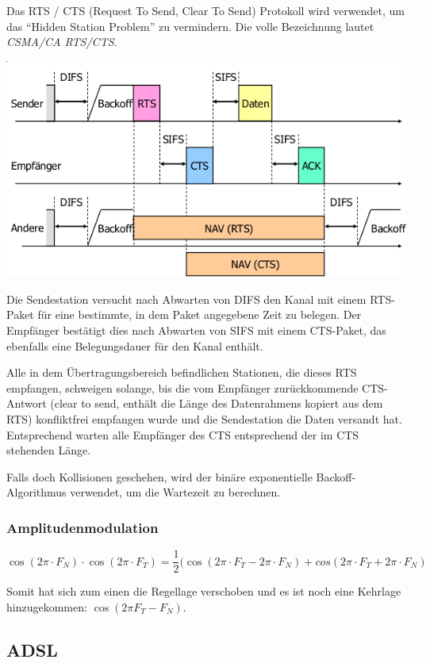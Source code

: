 Das RTS / CTS (Request To Send, Clear To Send) Protokoll wird verwendet, um das
``Hidden Station Problem'' zu vermindern. Die volle Bezeichnung lautet
\textit{CSMA/CA RTS/CTS}.

\begin{center}
	\includegraphics[width=.8\textwidth]{media/rts_cts.png}
\end{center}

Die Sendestation versucht nach Abwarten von DIFS den Kanal mit einem RTS-Paket
für eine bestimmte, in dem Paket angegebene Zeit zu belegen. Der Empfänger
bestätigt dies nach Abwarten von SIFS mit einem CTS-Paket, das ebenfalls eine
Belegungsdauer für den Kanal enthält.

Alle in dem Übertragungsbereich befindlichen Stationen, die dieses RTS
empfangen, schweigen solange, bis die vom Empfänger zurückkommende CTS-Antwort
(clear to send, enthält die Länge des Datenrahmens kopiert aus dem RTS)
konfliktfrei empfangen wurde und die Sendestation die Daten versandt hat.
Entsprechend warten alle Empfänger des CTS entsprechend der im CTS stehenden
Länge.

Falls doch Kollisionen geschehen, wird der binäre exponentielle
Backoff-Algorithmus verwendet, um die Wartezeit zu berechnen.

\subsubsection{Amplitudenmodulation}

\[
	\cos (2\pi \cdot F_N) \cdot \cos (2\pi \cdot F_T)
	= \frac{1}{2}(\cos (2\pi \cdot F_T - 2\pi \cdot F_N)
	+ cos(2\pi \cdot F_T + 2\pi \cdot F_N)
\]

Somit hat sich zum einen die Regellage verschoben und es ist noch eine Kehrlage
hinzugekommen: $\cos (2\pi F_T - F_N)$.


\subsection{ADSL}

